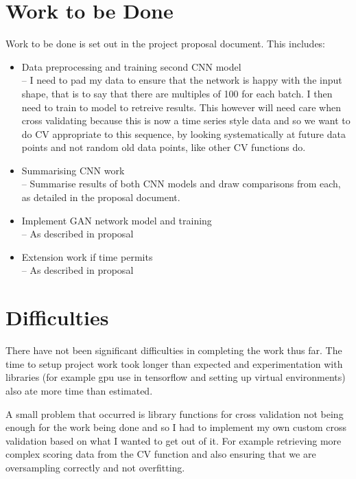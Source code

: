 \documentclass[12pt,a4paper,twoside]{article}
\begin{document}
 \section*{Work to be Done}
 
 Work to be done is set out in the project proposal document. This includes:
  \begin{itemize}
 \item Data preprocessing and training second CNN model \\
 -- I need to pad my data to ensure that the network is happy with the input shape, that is to say that there are multiples of 100 for each batch. I then need to train to model to retreive results. This however will need care when cross validating because this is now a time series style data and so we want to do CV appropriate to this sequence, by looking systematically at future data points and not random old data points, like other CV functions do. 
 
 \item Summarising CNN work \\
 -- Summarise results of both CNN models and draw comparisons from each, as detailed in the proposal document.
 \item Implement GAN network model and training \\
 -- As described in proposal
 \item Extension work if time permits \\
 -- As described in proposal
 \end{itemize}
  
 \section*{Difficulties}
 
 There have not been significant difficulties in completing the work thus far. The time to setup project work took longer than expected and experimentation with libraries (for example gpu use in tensorflow and setting up virtual environments) also ate more time than estimated. 
 
 A small problem that occurred is library functions for cross validation not being enough for the work being done and so I had to implement my own custom cross validation based on what I wanted to get out of it. For example retrieving more complex scoring data from the CV function and also ensuring that we are oversampling correctly and not overfitting. 
 
 



\end{document}
